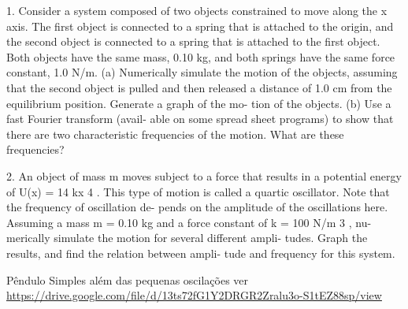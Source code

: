 1. Consider a system composed of two objects constrained
to move along the x axis. The first object is connected to
a spring that is attached to the origin, and the second object
is connected to a spring that is attached to the first object.
Both objects have the same mass, 0.10 kg, and both springs
have the same force constant, 1.0 N/m. (a) Numerically
simulate the motion of the objects, assuming that the second
object is pulled and then released a distance of 1.0 cm
from the equilibrium position. Generate a graph of the mo-
tion of the objects. (b) Use a fast Fourier transform (avail-
able on some spread sheet programs) to show that there
are two characteristic frequencies of the motion. What are
these frequencies?

2. An object of mass m moves subject to a force that results in a
potential energy of U(x) = 14 kx 4 . This type of motion is called
a quartic oscillator. Note that the frequency of oscillation de-
pends on the amplitude of the oscillations here. Assuming a
mass m = 0.10 kg and a force constant of k = 100 N/m 3 , nu-
merically simulate the motion for several different ampli-
tudes. Graph the results, and find the relation between ampli-
tude and frequency for this system.

Pêndulo Simples além das pequenas oscilações
ver  \href{URL}{https://drive.google.com/file/d/13ts72fG1Y2DRGR2Zralu3o-S1tEZ88sp/view}

